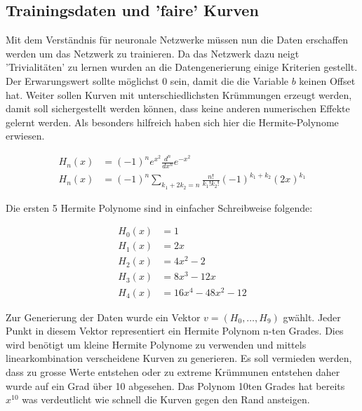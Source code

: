 \subsection{Trainingsdaten und 'faire' Kurven}
Mit dem Verständnis für neuronale Netzwerke müssen nun die Daten erschaffen werden um das Netzwerk zu trainieren. Da das Netzwerk dazu neigt 'Trivialitäten' zu lernen wurden an die Datengenerierung einige Kriterien gestellt. Der Erwarungswert sollte möglichst 0 sein, damit die die Variable $b$ keinen Offset hat. Weiter sollen Kurven mit unterschiedlichsten Krümmungen erzeugt werden, damit soll sichergestellt werden können, dass keine anderen numerischen Effekte gelernt werden. Als besonders hilfreich haben sich hier die Hermite-Polynome erwiesen.

\begin{align}
H_{n}(x) &=(-1)^{n}e^{x^{2}}{\frac {d^{n}}{d x^{n}}}e^{-x^{2}} \\
H_{n}(x) &=(-1)^{n}\sum _{k_{1}+2k_{2}=n}{\frac {n!}{k_{1}!k_{2}!}}(-1)^{k_{1}+k_{2}}(2x)^{k_{1}}
\end{align}

Die ersten 5 Hermite Polynome sind in einfacher Schreibweise folgende:

\begin{align}
H_{0}(x) &= 1\\
H_{1}(x) &= 2x\\
H_{2}(x) &= 4x^{2}-2\\
H_{3}(x) &= 8x^{3}-12x\\
H_{4}(x) &= 16x^{4}-48x^{2}-12
\end{align}

Zur Generierung der Daten wurde ein Vektor $v=(H_0, \dots ,H_9)$ gwählt. Jeder Punkt in diesem Vektor representiert ein Hermite Polynom n-ten Grades. Dies wird benötigt um kleine Hermite Polynome zu verwenden und mittels linearkombination verscheidene Kurven zu generieren. Es soll vermieden werden, dass zu grosse Werte entstehen oder zu extreme Krümmunen entstehen daher wurde auf ein Grad über 10 abgesehen. Das Polynom 10ten Grades hat bereits $x^{10}$ was verdeutlicht wie schnell die Kurven gegen den Rand ansteigen.

